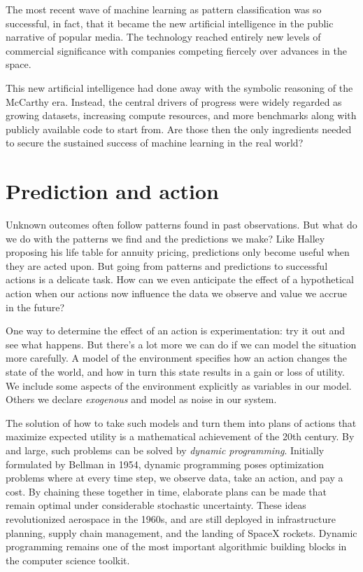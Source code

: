 \documentclass{tufte-book}
\begin{document}
The most recent wave of machine learning as pattern classification was
so successful, in fact, that it became the new artificial intelligence
in the public narrative of popular media. The technology reached
entirely new levels of commercial significance with companies competing
fiercely over advances in the space.

This new artificial intelligence had done away with the symbolic
reasoning of the McCarthy era. Instead, the central drivers of progress
were widely regarded as growing datasets, increasing compute resources,
and more benchmarks along with publicly available code to start from.
Are those then the only ingredients needed to secure the sustained
success of machine learning in the real world?

\hypertarget{prediction-and-action}{%
\section{Prediction and action}\label{prediction-and-action}}

Unknown outcomes often follow patterns found in past observations. But
what do we do with the patterns we find and the predictions we make?
Like Halley proposing his life table for annuity pricing, predictions
only become useful when they are acted upon. But going from patterns and
predictions to successful actions is a delicate task. How can we even
anticipate the effect of a hypothetical action when our actions now
influence the data we observe and value we accrue in the future?

One way to determine the effect of an action is experimentation: try it
out and see what happens. But there's a lot more we can do if we can
model the situation more carefully. A model of the environment specifies
how an action changes the state of the world, and how in turn this state
results in a gain or loss of utility. We include some aspects of the
environment explicitly as variables in our model. Others we declare
\emph{exogenous} and model as noise in our system.

The solution of how to take such models and turn them into plans of
actions that maximize expected utility is a mathematical achievement of
the 20th century. By and large, such problems can be solved by
\emph{dynamic programming}. Initially formulated by Bellman in 1954,
dynamic programming poses optimization problems where at every time
step, we observe data, take an action, and pay a cost. By chaining these
together in time, elaborate plans can be made that remain optimal under
considerable stochastic uncertainty. These ideas revolutionized
aerospace in the 1960s, and are still deployed in infrastructure
planning, supply chain management, and the landing of SpaceX rockets.
Dynamic programming remains one of the most important algorithmic
building blocks in the computer science toolkit.
\end{document}
